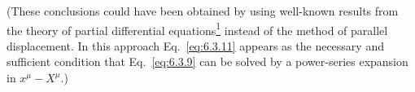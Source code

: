 (These conclusions could have been obtained by using well-known results from
the theory of partial differential
equations\hyperref[ch6-ref-1]{\textsuperscript{1}} instead of the method of
parallel displacement. In this approach Eq.~\eqref{eq:6.3.11} appears as the
necessary and sufficient condition that Eq.~\eqref{eq:6.3.9} can be solved by
a power-series expansion in \(x^\mu-X^\mu\).)
